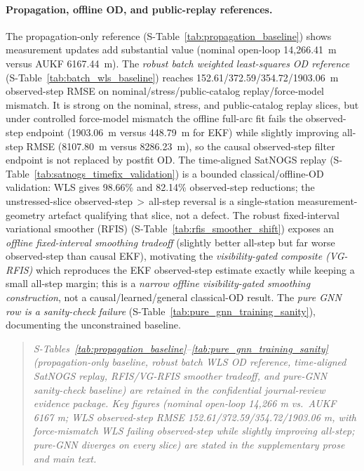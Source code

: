 \documentclass{article}
\begin{document}
\paragraph{Propagation, offline OD, and public-replay references.}
The propagation-only reference (S-Table~\ref{tab:propagation_baseline}) shows measurement updates add substantial value (nominal open-loop 14{,}266.41~m versus AUKF 6167.44~m). The \emph{robust batch weighted least-squares OD reference} (S-Table~\ref{tab:batch_wls_baseline}) reaches 152.61/372.59/354.72/1903.06~m observed-step RMSE on nominal/stress/public-catalog replay/force-model mismatch. It is strong on the nominal, stress, and public-catalog replay slices, but under controlled force-model mismatch the offline full-arc fit fails the observed-step endpoint (1903.06~m versus 448.79~m for EKF) while slightly improving all-step RMSE (8107.80~m versus 8286.23~m), so the causal observed-step filter endpoint is not replaced by postfit OD. The time-aligned SatNOGS replay (S-Table~\ref{tab:satnogs_timefix_validation}) is a bounded classical/offline-OD validation: WLS gives 98.66\% and 82.14\% observed-step reductions; the unstressed-slice observed-step\,$>$\,all-step reversal is a single-station measurement-geometry artefact qualifying that slice, not a defect. The robust fixed-interval variational smoother (RFIS) (S-Table~\ref{tab:rfis_smoother_shift}) exposes an \emph{offline fixed-interval smoothing tradeoff} (slightly better all-step but far worse observed-step than causal EKF), motivating the \emph{visibility-gated composite (VG-RFIS)} which reproduces the EKF observed-step estimate exactly while keeping a small all-step margin; this is a \emph{narrow offline visibility-gated smoothing construction}, not a causal/learned/general classical-OD result. The \emph{pure GNN row is a sanity-check failure} (S-Table~\ref{tab:pure_gnn_training_sanity}), documenting the unconstrained baseline.
\label{tab:propagation_baseline}%
\label{tab:batch_wls_baseline}%
\label{tab:satnogs_timefix_validation}%
\label{tab:rfis_smoother_shift}%
\label{tab:pure_gnn_training_sanity}%
\begin{quote}\small
\emph{S-Tables~\ref{tab:propagation_baseline}--\ref{tab:pure_gnn_training_sanity} (propagation-only baseline, robust batch WLS OD reference, time-aligned SatNOGS replay, RFIS/VG-RFIS smoother tradeoff, and pure-GNN sanity-check baseline) are retained in the confidential journal-review evidence package. Key figures (nominal open-loop 14,266 m vs.\ AUKF 6167 m; WLS observed-step RMSE 152.61/372.59/354.72/1903.06 m, with force-mismatch WLS failing observed-step while slightly improving all-step; pure-GNN diverges on every slice) are stated in the supplementary prose and main text.}
\end{quote}
\end{document}
